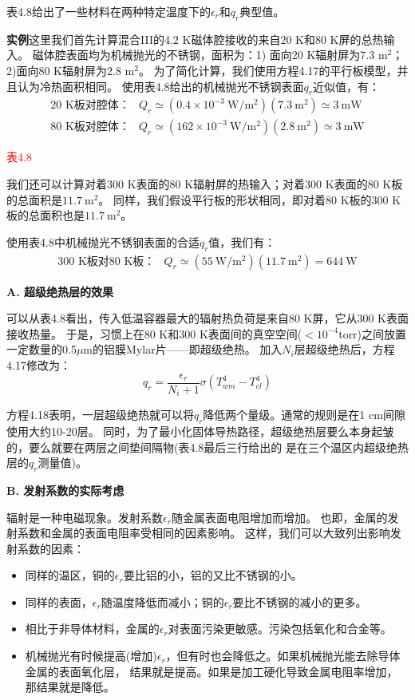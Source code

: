 表4.8给出了一些材料在两种特定温度下的$\epsilon_r$和$q_r$典型值。

\textbf{实例}\qquad 这里我们首先计算混合III的4.2 K磁体腔接收的来自20 K和80 K屏的总热输入。
磁体腔表面均为机械抛光的不锈钢，面积为：1) 面向20 K辐射屏为7.3 $\mathrm{m^2}$；2)面向80 K辐射屏为2.8 $\mathrm{m^2}$。
为了简化计算，我们使用方程4.17的平行板模型，并且认为冷热面积相同。
使用表4.8给出的机械抛光不锈钢表面$q_r$近似值，有：
\begin{align*}
\mbox{20 K板对腔体：} &Q_r\simeq (0.4\times 10^{-3}\ \mathrm{W/m^2})(7.3\ \mathrm{m^2})\simeq 3\ \mathrm{mW}\\
\mbox{80 K板对腔体：} &Q_r\simeq (162\times 10^{-3}\ \mathrm{W/m^2})(2.8\ \mathrm{m^2})\simeq 3\ \mathrm{mW}
\end{align*}

\textcolor{red}{表4.8}

我们还可以计算对着300 K表面的80 K辐射屏的热输入；对着300 K表面的80 K板的总面积是$11.7\ \mathrm{m^2}$。
同样，我们假设平行板的形状相同，即对着80 K板的300 K板的总面积也是$11.7\ \mathrm{m^2}$。

使用表4.8中机械抛光不锈钢表面的合适$q_r$值，我们有：
\begin{align*}
\mbox{300 K板对80 K板：} &Q_r\simeq (55\ \mathrm{W/m^2})(11.7\ \mathrm{m^2})=644\ \mathrm{W}
\end{align*}

\textbf{A. 超级绝热层的效果}

可以从表4.8看出，传入低温容器最大的辐射热负荷是来自80 K屏，它从300 K表面接收热量。
于是，习惯上在80 K和300 K表面间的真空空间($<10^{-4}$torr)之间放置一定数量的0.5$\mu $m的铝膜Mylar片——即超级绝热。
加入$N_i$层超级绝热后，方程4.17修改为：
\begin{equation}%
q_r=\frac{\epsilon_r}{N_i+1}\sigma(T_{wm}^4-T_{cl}^4)
\end{equation}

方程4.18表明，一层超级绝热就可以将$q_r$降低两个量级。通常的规则是在1 cm间隙使用大约10-20层。
同时，为了最小化固体导热路径，超级绝热层要么本身起皱的，要么就要在两层之间垫间隔物(表4.8最后三行给出的
是在三个温区内超级绝热层的$q_r$测量值)。

\textbf{B. 发射系数的实际考虑}

辐射是一种电磁现象。发射系数$\epsilon_r$随金属表面电阻增加而增加。
也即，金属的发射系数和金属的表面电阻率受相同的因素影响。
这样，我们可以大致列出影响发射系数的因素：
\begin{itemize}
	\item 同样的温区，铜的$\epsilon_r$要比铝的小，铝的又比不锈钢的小。
	\item 同样的表面，$\epsilon_r$随温度降低而减小；铜的$\epsilon_r$要比不锈钢的减小的更多。
	\item 相比于非导体材料，金属的$\epsilon_r$对表面污染更敏感。污染包括氧化和合金等。
	\item 机械抛光有时候提高(增加)$\epsilon_r$，但有时也会降低之。如果机械抛光能去除导体金属的表面氧化层，
	结果就是提高。如果是加工硬化导致金属电阻率增加，那结果就是降低。
\end{itemize}


